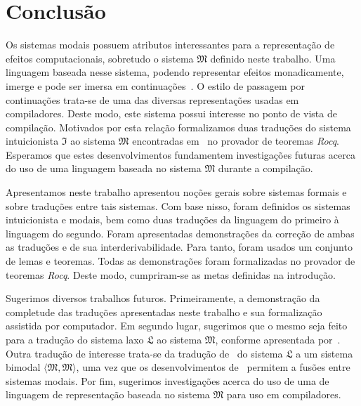 \chapter{Conclusão}
    Os sistemas modais possuem atributos interessantes para a representação de efeitos computacionais, sobretudo o sistema $\mathfrak{M}$ definido neste trabalho.
    Uma linguagem baseada nesse sistema, podendo representar efeitos monadicamente, imerge e pode ser imersa em continuações~\citep{Filinski.1994}.
    O estilo de passagem por continuações trata-se de uma das diversas representações usadas em compiladores.
    Deste modo, este sistema possui interesse no ponto de vista de compilação.
    Motivados por esta relação formalizamos duas traduções do sistema intuicionista $\mathfrak{I}$ ao sistema $\mathfrak{M}$ encontradas em~\cite{Troelstra+Schwichtenberg.2000} no provador de teoremas \emph{Rocq}.
    Esperamos que estes desenvolvimentos fundamentem investigações futuras acerca do uso de uma linguagem baseada no sistema $\mathfrak{M}$ durante a compilação.

    \vspace{.5\baselineskip}
    Apresentamos neste trabalho apresentou noções gerais sobre sistemas formais e sobre traduções entre tais sistemas.
    Com base nisso, foram definidos os sistemas intuicionista e modais, bem como duas traduções da linguagem do primeiro à linguagem do segundo.
    Foram apresentadas demonstrações da correção de ambas as traduções e de sua interderivabilidade.
    Para tanto, foram usados um conjunto de lemas e teoremas.
    Todas as demonstrações foram formalizadas no provador de teoremas \emph{Rocq}.
    Deste modo, cumpriram-se as metas definidas na introdução.

    \vspace{.5\baselineskip}
    Sugerimos diversos trabalhos futuros. Primeiramente, a demonstração da completude das traduções apresentadas neste trabalho e sua formalização assistida por computador.
    Em segundo lugar, sugerimos que o mesmo seja feito para a tradução do sistema laxo $\mathfrak{L}$ ao sistema $\mathfrak{M}$, conforme apresentada por~\cite{Pfenning+Davies.2001}. 
    Outra tradução de interesse trata-se da tradução de~\cite{Fairtlough+Mendler.1997} do sistema $\mathfrak{L}$ a um sistema bimodal $\langle\mathfrak{M},\mathfrak{M}\rangle$, uma vez que os desenvolvimentos de~\cite{Nunes+Roggia+Torrens.2025} permitem a fusões entre sistemas modais.
    Por fim, sugerimos investigações acerca do uso de uma de linguagem de representação baseada no sistema $\mathfrak{M}$ para uso em compiladores.


